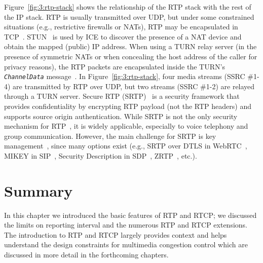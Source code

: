 Figure~\ref{fig:3:rtp-stack} shows the relationship of the RTP stack with the
rest of the IP stack. RTP is usually transmitted over UDP, but under some
constrained situations (e.g., restrictive firewalls or NATs), RTP may be
encapsulated in TCP~\cite{rfc3550}. STUN~\cite{rfc5389} is used by ICE to
discover the presence of a NAT device and obtain the mapped (public) IP
address. When using a TURN relay server (in the presence of symmetric NATs or
when concealing the host address of the caller for privacy reasons), the RTP
packets are encapsulated inside the TURN's \emph\texttt{ChannelData}
message~\cite{rfc5766}. In Figure~\ref{fig:3:rtp-stack}, four media streams
(SSRC \#1-4) are transmitted by RTP over UDP, but two streams (SSRC \#1-2) are
relayed through a TURN server. Secure RTP (SRTP)~\cite{rfc3611} is a security
framework that provides confidentiality by encrypting RTP payload (not the RTP
headers) and supports source origin authentication. While SRTP is not the only
security mechanism for RTP~\cite{draft.srtp-not-must}, it is widely
applicable, especially to voice telephony and group communication. However,
the main challenge for SRTP is key management~\cite{draft.sec-opts}, since
many options exist (e.g., SRTP over DTLS in WebRTC~\cite{rfc5763}, MIKEY in
SIP~\cite{rfc3830}, Security Description in SDP~\cite{rfc4566},
ZRTP~\cite{RFC6189}, etc.).

\section{Summary}

In this chapter we introduced the basic features of RTP and RTCP; we discussed
the limits on reporting interval and the numerous RTP and RTCP extensions.
The introduction to RTP and RTCP largely provides context and helps understand
the design constraints  for multimedia congestion control which are discussed 
in more detail in the forthcoming chapters.
